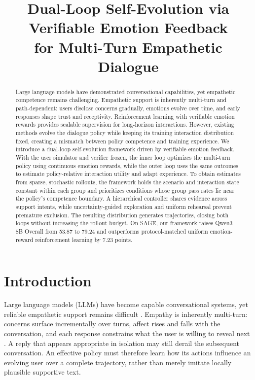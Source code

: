 \documentclass[letterpaper]{article}
\title{Dual-Loop Self-Evolution via Verifiable Emotion Feedback \\ for Multi-Turn Empathetic Dialogue}
\author{\PublicAuthors}
\begin{document}
\maketitle

\begin{abstract}
Large language models have demonstrated conversational capabilities, yet empathetic competence remains challenging. Empathetic support is inherently multi-turn and path-dependent: users disclose concerns gradually, emotions evolve over time, and early responses shape trust and receptivity. Reinforcement learning with verifiable emotion rewards provides scalable supervision for long-horizon interactions. However, existing methods evolve the dialogue policy while keeping its training interaction distribution fixed, creating a mismatch between policy competence and training experience. We introduce a dual-loop self-evolution framework driven by verifiable emotion feedback. With the user simulator and verifier frozen, the inner loop optimizes the multi-turn policy using continuous emotion rewards, while the outer loop uses the same outcomes to estimate policy-relative interaction utility and adapt experience. To obtain estimates from sparse, stochastic rollouts, the framework holds the scenario and interaction state constant within each group and prioritizes conditions whose group pass rates lie near the policy's competence boundary. A hierarchical controller shares evidence across support intents, while uncertainty-guided exploration and uniform rehearsal prevent premature exclusion. The resulting distribution generates trajectories, closing both loops without increasing the rollout budget. On SAGE, our framework raises Qwen3-8B Overall from 53.87 to 79.24 and outperforms protocol-matched uniform emotion-reward reinforcement learning by 7.23 points.
\end{abstract}

\section{Introduction}
Large language models (LLMs) have become capable conversational systems, yet reliable empathetic support remains difficult \cite{rashkin2019empathetic,esconv2021,multiesc2022}. Empathy is inherently multi-turn: concerns surface incrementally over turns, affect rises and falls with the conversation, and each response constrains what the user is willing to reveal next \cite{supporter2023,emodynamix2025,wutraj2026,sage2025}. A reply that appears appropriate in isolation may still derail the subsequent conversation. An effective policy must therefore learn how its actions influence an evolving user over a complete trajectory, rather than merely imitate locally plausible supportive text.
\end{document}
